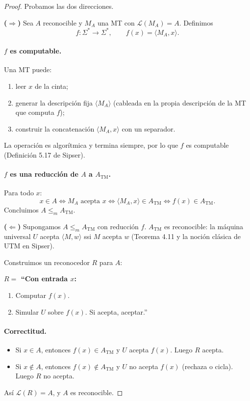 \documentclass[11pt,a4paper]{article}
\theoremstyle{plain}
\theoremstyle{definition}
\theoremstyle{remark}
\newcommand{\TM}{\mathrm{TM}}
\newcommand{\enc}[1]{\langle #1\rangle}
\newcommand{\lang}{\mathcal{L}}
\newcommand{\Sstar}{\Sigma^{*}}
\newcommand{\redm}{\le_{m}}
\newcommand{\ATM}{A_{\TM}}
\begin{document}
\begin{proof}
Probamos las dos direcciones.

\textbf{($\Rightarrow$)} Sea $A$ reconocible y $M_A$ una MT con
$\lang(M_A)=A$. Definimos
\[
  f:\Sstar\to\Sstar,\qquad f(x) = \enc{M_A, x}.
\]

\paragraph{$f$ es computable.}
Una MT puede:
\begin{enumerate}
  \item leer $x$ de la cinta;
  \item generar la descripci\'on fija $\enc{M_A}$ (cableada en la propia
        descripci\'on de la MT que computa $f$);
  \item construir la concatenaci\'on $\enc{M_A,x}$ con un separador.
\end{enumerate}
La operaci\'on es algor\'itmica y termina siempre, por lo que $f$ es
computable (Definici\'on 5.17 de Sipser).

\paragraph{$f$ es una reducci\'on de $A$ a $\ATM$.}
Para todo $x$:
\[
  x\in A
  \iff M_A \text{ acepta } x
  \iff \enc{M_A,x}\in \ATM
  \iff f(x)\in \ATM.
\]
Concluimos $A\redm \ATM$.

\textbf{($\Leftarrow$)} Supongamos $A\redm \ATM$ con reducci\'on $f$.
$\ATM$ es reconocible: la m\'aquina universal $U$ acepta $\enc{M,w}$ ssi
$M$ acepta $w$ (Teorema 4.11 y la noci\'on cl\'asica de UTM en Sipser).

Construimos un reconocedor $R$ para $A$:

\medskip\noindent\textbf{$R=$ ``Con entrada $x$:}
\begin{enumerate}
  \item Computar $f(x)$.
  \item Simular $U$ sobre $f(x)$. Si acepta, aceptar.''
\end{enumerate}
\medskip

\paragraph{Correctitud.}
\begin{itemize}
  \item Si $x\in A$, entonces $f(x)\in\ATM$ y $U$ acepta $f(x)$. Luego $R$
        acepta.
  \item Si $x\notin A$, entonces $f(x)\notin\ATM$ y $U$ no acepta
        $f(x)$ (rechaza o cicla). Luego $R$ no acepta.
\end{itemize}
As\'i $\lang(R)=A$, y $A$ es reconocible.
\end{proof}
\end{document}
